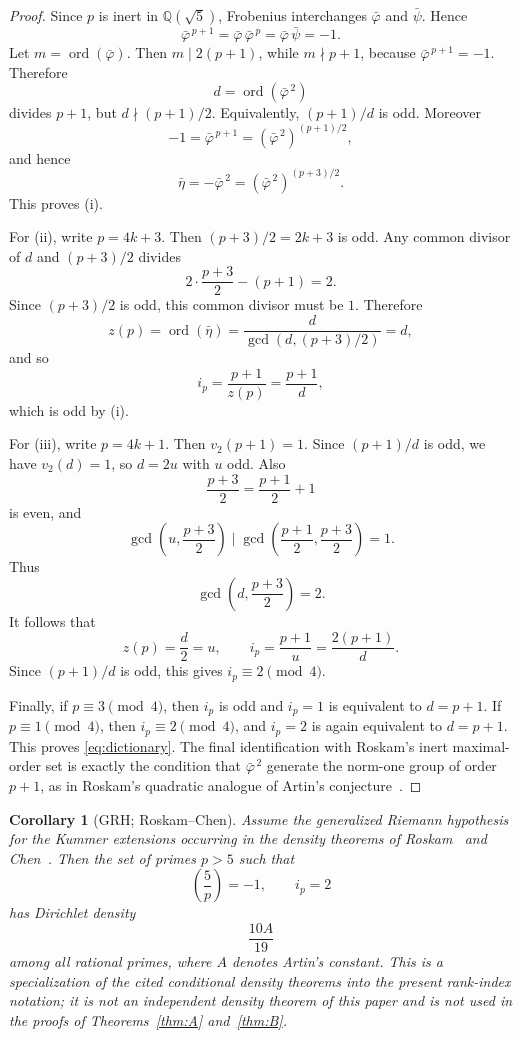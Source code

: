 \documentclass[11pt]{amsart}
\theoremstyle{plain}
\newtheorem{corollary}[theorem]{Corollary}
\theoremstyle{definition}
\newcommand{\leg}[2]{\left(\frac{#1}{#2}\right)}
\begin{document}
\begin{proof}
Since \(p\) is inert in \(\mathbb Q(\sqrt5)\), Frobenius interchanges
\(\bar\varphi\) and \(\bar\psi\).  Hence
\[
  \bar\varphi^{\,p+1}
  =
  \bar\varphi\,\bar\varphi^{\,p}
  =
  \bar\varphi\,\bar\psi
  =
  -1.
\]
Let \(m=\operatorname{ord}(\bar\varphi)\).  Then
\(m\mid2(p+1)\), while \(m\nmid p+1\), because
\(\bar\varphi^{\,p+1}=-1\).  Therefore
\[
  d=\operatorname{ord}(\bar\varphi^{\,2})
\]
divides \(p+1\), but \(d\nmid(p+1)/2\).  Equivalently,
\((p+1)/d\) is odd.  Moreover
\[
  -1
  =
  \bar\varphi^{\,p+1}
  =
  (\bar\varphi^{\,2})^{(p+1)/2},
\]
and hence
\[
  \bar\eta=-\bar\varphi^{\,2}
  =
  (\bar\varphi^{\,2})^{(p+3)/2}.
\]
This proves (i).

For (ii), write \(p=4k+3\).  Then \((p+3)/2=2k+3\) is odd.  Any common
divisor of \(d\) and \((p+3)/2\) divides
\[
  2\cdot\frac{p+3}{2}-(p+1)=2.
\]
Since \((p+3)/2\) is odd, this common divisor must be \(1\).  Therefore
\[
  z(p)
  =
  \operatorname{ord}(\bar\eta)
  =
  \frac{d}{\gcd(d,(p+3)/2)}
  =
  d,
\]
and so
\[
  i_p=\frac{p+1}{z(p)}=\frac{p+1}{d},
\]
which is odd by (i).

For (iii), write \(p=4k+1\).  Then \(v_2(p+1)=1\).  Since
\((p+1)/d\) is odd, we have \(v_2(d)=1\), so \(d=2u\) with \(u\) odd.
Also
\[
  \frac{p+3}{2}=\frac{p+1}{2}+1
\]
is even, and
\[
  \gcd\!\left(u,\frac{p+3}{2}\right)
  \mid
  \gcd\!\left(\frac{p+1}{2},\frac{p+3}{2}\right)
  =
  1.
\]
Thus
\[
  \gcd\!\left(d,\frac{p+3}{2}\right)=2.
\]
It follows that
\[
  z(p)=\frac d2=u,
  \qquad
  i_p=\frac{p+1}{u}=\frac{2(p+1)}{d}.
\]
Since \((p+1)/d\) is odd, this gives \(i_p\equiv2\pmod4\).

Finally, if \(p\equiv3\pmod4\), then \(i_p\) is odd and
\(i_p=1\) is equivalent to \(d=p+1\).  If \(p\equiv1\pmod4\), then
\(i_p\equiv2\pmod4\), and \(i_p=2\) is again equivalent to
\(d=p+1\).  This proves \eqref{eq:dictionary}.  The final identification with Roskam's inert maximal-order set is
exactly the condition that \(\bar\varphi^{\,2}\) generate the norm-one
group of order \(p+1\), as in Roskam's quadratic analogue of Artin's
conjecture~\cite{Roskam2000}.
\end{proof}
\begin{corollary}[GRH; Roskam--Chen]
\label{cor:inert-index-two-density}
Assume the generalized Riemann hypothesis for the Kummer extensions
occurring in the density theorems of Roskam~\cite{Roskam2000} and
Chen~\cite{Chen2002}. Then the set of primes $p>5$ such that
\[
\leg{5}{p}=-1,
\qquad
i_p=2
\]
has Dirichlet density
\[
\frac{10A}{19}
\]
among all rational primes, where $A$ denotes Artin's constant. This
is a specialization of the cited conditional density theorems into
the present rank-index notation; it is not an independent density
theorem of this paper and is not used in the proofs of
Theorems~\ref{thm:A} and~\ref{thm:B}.
\end{corollary}
\end{document}
